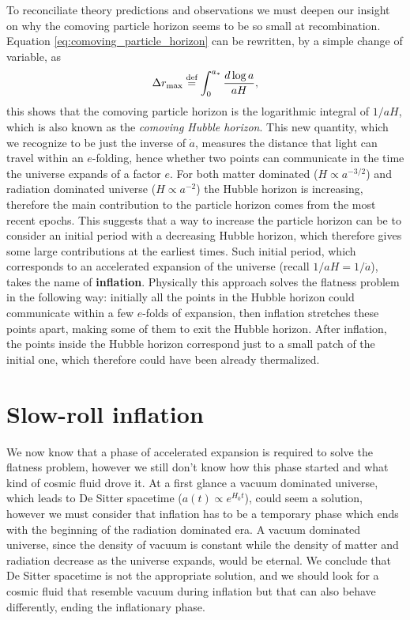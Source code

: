To reconciliate theory predictions and observations we must deepen our insight on why the comoving particle horizon seems to be so small at recombination. Equation \eqref{eq:comoving_particle_horizon} can be rewritten, by a simple change of variable, as
$$\Delta r_{\text{max}}\stackrel{\text{def}}{=}\int_0^{a_{*}}\frac{d\log a}{aH},$$
this shows that the comoving particle horizon is the logarithmic integral of $1/aH$, which is also known as the \emph{comoving Hubble horizon}. This new quantity, which we recognize to be just the inverse of $\dot a$, measures the distance that light can travel within an $e$-folding, hence whether two points can communicate in the time the universe expands of a factor $e$. For both matter dominated ($H\propto a^{-3/2}$) and radiation dominated universe ($H\propto a ^{-2}$) the Hubble horizon is increasing, therefore the main contribution to the particle horizon comes from the most recent epochs. This suggests that a way to increase the particle horizon can be to consider an initial period with a decreasing Hubble horizon, which therefore gives some large contributions at the earliest times. Such initial period, which corresponds to an accelerated expansion of the universe (recall $1/aH=1/\dot a$), takes the name of \textbf{inflation}. Physically this approach solves the flatness problem in the following way: initially all the points in the Hubble horizon could communicate within a few $e$-folds of expansion, then inflation stretches these points apart, making some of them to exit the Hubble horizon. After inflation, the points inside the Hubble horizon correspond just to a small patch of the initial one, which therefore could have been already thermalized. 
\section{Slow-roll inflation}
We now know that a phase of accelerated expansion is required to solve the flatness problem, however we still don't know how this phase started and what kind of cosmic fluid drove it. At a first glance a vacuum dominated universe, which leads to De Sitter spacetime ($a(t)\propto e^{H_0t}$), could seem a solution, however we must consider that inflation has to be a temporary phase which ends with the beginning of the radiation dominated era. A vacuum dominated universe, since the density of vacuum is constant while the density of matter and radiation decrease as the universe expands, would be eternal. We conclude that De Sitter spacetime is not the appropriate solution, and we should look for a cosmic fluid that resemble vacuum during inflation but that can also behave differently, ending the inflationary phase.

